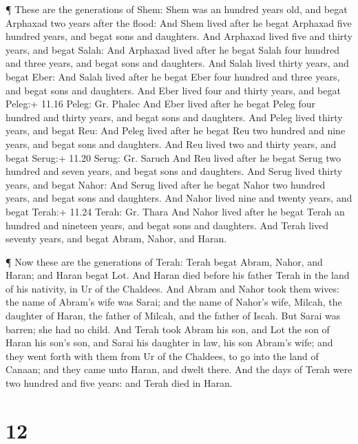  ¶ These are the generations of Shem: Shem was an hundred
years old, and begat Arphaxad two years after the flood: 
And Shem lived after he begat Arphaxad five hundred years, and begat
sons and daughters.  And Arphaxad lived five and thirty
years, and begat Salah:  And Arphaxad lived after he begat
Salah four hundred and three years, and begat sons and daughters.
 And Salah lived thirty years, and begat Eber:
 And Salah lived after he begat Eber four hundred and three
years, and begat sons and daughters.  And Eber lived four
and thirty years, and begat Peleg:+ 11.16 Peleg: Gr. Phalec
 And Eber lived after he begat Peleg four hundred and
thirty years, and begat sons and daughters.  And Peleg
lived thirty years, and begat Reu:  And Peleg lived after
he begat Reu two hundred and nine years, and begat sons and daughters.
 And Reu lived two and thirty years, and begat Serug:+
11.20 Serug: Gr. Saruch  And Reu lived after he begat Serug
two hundred and seven years, and begat sons and daughters. 
And Serug lived thirty years, and begat Nahor:  And Serug
lived after he begat Nahor two hundred years, and begat sons and
daughters.  And Nahor lived nine and twenty years, and
begat Terah:+ 11.24 Terah: Gr. Thara  And Nahor lived after
he begat Terah an hundred and nineteen years, and begat sons and
daughters.  And Terah lived seventy years, and begat Abram,
Nahor, and Haran.

 ¶ Now these are the generations of Terah: Terah begat
Abram, Nahor, and Haran; and Haran begat Lot.  And Haran
died before his father Terah in the land of his nativity, in Ur of the
Chaldees.  And Abram and Nahor took them wives: the name of
Abram's wife was Sarai; and the name of Nahor's wife, Milcah, the
daughter of Haran, the father of Milcah, and the father of Iscah.
 But Sarai was barren; she had no child.  And
Terah took Abram his son, and Lot the son of Haran his son's son, and
Sarai his daughter in law, his son Abram's wife; and they went forth
with them from Ur of the Chaldees, to go into the land of Canaan; and
they came unto Haran, and dwelt there.  And the days of
Terah were two hundred and five years: and Terah died in Haran.

\hypertarget{section-11}{%
\section{12}\label{section-11}}


